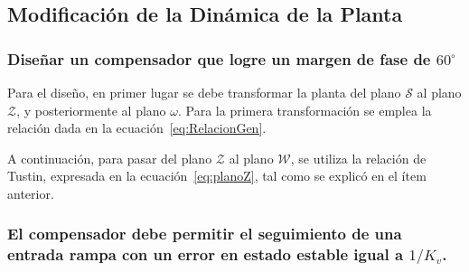 \subsection{Modificación de la Dinámica de la Planta}
\subsubsection{Diseñar un compensador que logre un margen de fase de $60^\circ$} 

Para el diseño, en primer lugar se debe transformar la planta del plano $\mathcal{S}$ al plano $\mathcal{Z}$, y posteriormente al plano $\mathcal{\omega}$. Para la primera transformación se emplea la relación dada en la ecuación~\ref{eq:RelacionGen}.  

A continuación, para pasar del plano $\mathcal{Z}$ al plano $\mathcal{W}$, se utiliza la relación de Tustin, expresada en la ecuación~\ref{eq:planoZ}, tal como se explicó en el ítem anterior.


\subsubsection{El compensador debe permitir el seguimiento de una entrada rampa con un error en estado estable igual a $1/K_v$.}
